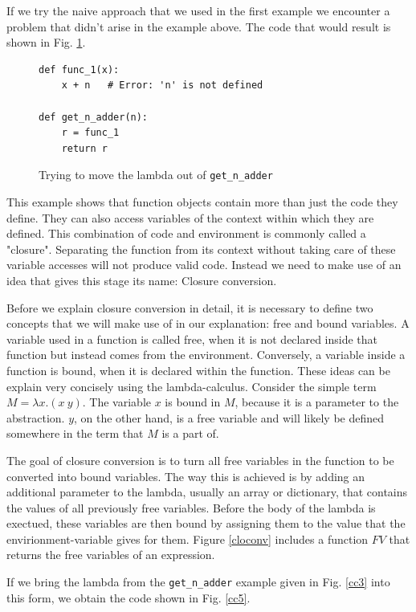\documentclass[11pt]{report}
\begin{document}
If we try the naive approach that we used in the first example we encounter a problem that didn't arise in the example above. The code that would result is shown in Fig. \ref{cc4}.

\begin{figure}[ht]
\begin{lstlisting}
def func_1(x):
    x + n   # Error: 'n' is not defined
    
def get_n_adder(n):
    r = func_1
    return r
\end{lstlisting}
\caption{Trying to move the lambda out of \texttt{get_n_adder}}
\label{cc4}
\end{figure}

This example shows that function objects contain more than just the code they define. They can also access variables of the context within which they are defined. This combination of code and environment is commonly called a "closure". Separating the function from its context without taking care of these variable accesses will not produce valid code. Instead we need to make use of an idea that gives this stage its name: Closure conversion.

Before we explain closure conversion in detail, it is necessary to define two concepts that we will make use of in our explanation: free and bound variables. A variable used in a function is called free, when it is not declared inside that function but instead comes from the environment. Conversely, a variable inside a function is bound, when it is declared within the function. These ideas can be explain very concisely using the lambda-calculus. Consider the simple term $M = \lambda x.(x\ y)$. The variable $x$ is bound in $M$, because it is a parameter to the abstraction. $y$, on the other hand, is a free variable and will likely be defined somewhere in the term that $M$ is a part of.

The goal of closure conversion is to turn all free variables in the function to be converted into bound variables. The way this is achieved is by adding an additional parameter to the lambda, usually an array or dictionary, that contains the values of all previously free variables. Before the body of the lambda is exectued, these variables are then bound by assigning them to the value that the envirionment-variable gives for them. Figure \ref{cloconv} includes a function $FV$ that returns the free variables of an expression.

If we bring the lambda from the \texttt{get_n_adder} example given in Fig. \ref{cc3} into this form, we obtain the code shown in Fig. \ref{cc5}.
\end{document}
